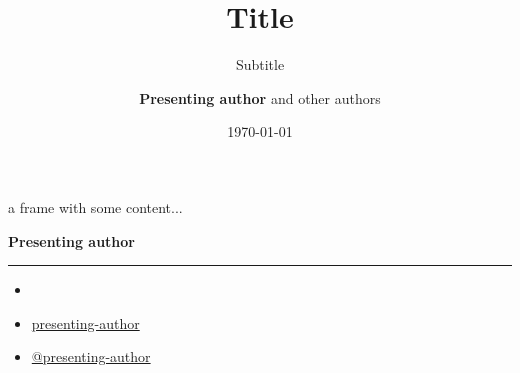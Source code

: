 \documentclass[english, aspectratio=169]{beamer}
\title{Title}
\subtitle{Subtitle}
\author{\textbf{Presenting author} and other authors}
\institute{Aarhus University}
\date{\today}
\begin{document}
\titleframe
\blankframe

\begin{frame}
  a frame with some content...
\end{frame}

\begin{frame}{}

  {\Large \textbf{Presenting author}}
  {\hrule width0.5\linewidth}

  \vspace{5pt}
  
  \begin{itemize}
  \item[\faIcon{envelope}] 
  \item[\faIcon{linkedin}] \href{https://www.linkedin.com/presenting-author}{presenting-author}
  \item[\faIcon{twitter}] \href{https://www.twitter.com/presenting-author}{@presenting-author}
  \end{itemize}
\end{frame}
\end{document}
